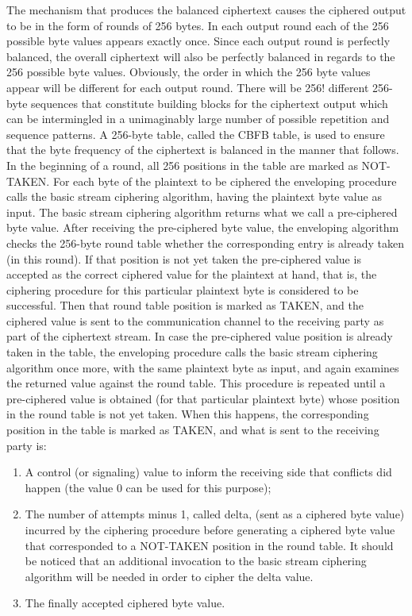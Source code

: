 \documentclass[conference]{IEEEtran}
\begin{document}
The mechanism that produces the balanced ciphertext causes the ciphered output to be in the form of rounds of 256 bytes. In each output round each of the 256 possible byte values appears exactly once.  Since each output round is perfectly balanced, the overall ciphertext will also be perfectly balanced in regards to the 256 possible byte values. Obviously, the order in which the 256 byte values appear will be different for each output round. There will be 256! different 256-byte sequences that constitute building blocks for the ciphertext output which can be intermingled in a unimaginably large number of possible repetition and sequence patterns.
A 256-byte table, called the CBFB table, is used to ensure that the byte frequency of the ciphertext is balanced in the manner that follows. In the beginning of a round, all 256 positions in the table are marked as NOT-TAKEN. For each byte of the plaintext to be ciphered the enveloping procedure calls the basic stream ciphering algorithm, having the plaintext byte value as input. The basic stream ciphering algorithm returns what we call a pre-ciphered byte value. After receiving the pre-ciphered byte value, the enveloping algorithm checks the 256-byte round table whether the corresponding entry is already taken (in this round). If that position is not yet taken the pre-ciphered value is accepted as the correct ciphered value for the plaintext at hand, that is, the ciphering procedure for this particular plaintext byte is considered to be successful. Then that round table position is marked as TAKEN, and the ciphered value is sent to the communication channel to the receiving party as part of the ciphertext stream. 
In case the pre-ciphered value position is already taken in the table, the enveloping procedure calls the basic stream ciphering algorithm once more, with the same plaintext byte as input, and again examines the returned value against the round table. This procedure is repeated until a pre-ciphered value is obtained (for that particular plaintext byte) whose position in the round table is not yet taken. When this happens, the corresponding position in the table is marked as TAKEN, and what is sent to the receiving party is:

\begin{enumerate}
	\item A control (or signaling) value to inform the receiving side that conflicts did happen (the value 0 can be used for this purpose); 
	\item The number of attempts minus 1, called delta, (sent as a ciphered byte value) incurred by the ciphering procedure before generating a ciphered byte value that corresponded to a NOT-TAKEN position in the round table. It should be noticed that an additional invocation to the basic stream ciphering algorithm will be needed in order to cipher the delta value.
	\item The finally accepted ciphered byte value. 
\end{enumerate}
\end{document}
